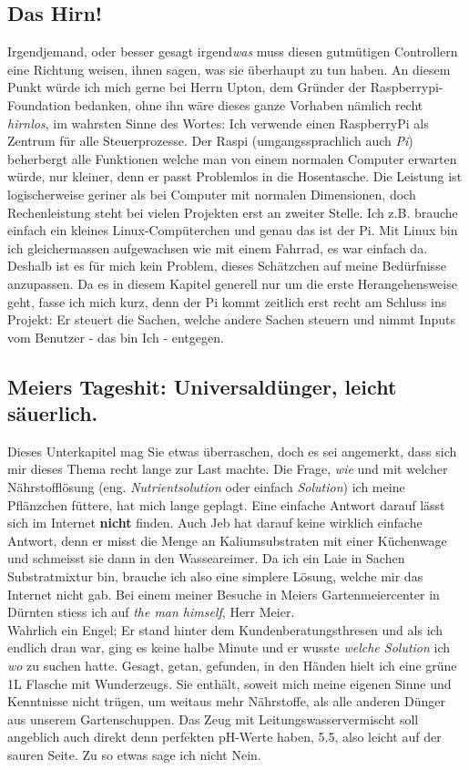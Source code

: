 \documentclass[12pt,titlepage,a4paper]{article}
\begin{document}
\subsection{Das Hirn!}
Irgendjemand, oder besser gesagt irgend\textit{was} muss diesen gutmütigen Controllern eine Richtung weisen, ihnen sagen, was sie überhaupt zu tun haben. An diesem Punkt würde ich mich gerne bei Herrn Upton, dem Gründer der Raspberrypi-Foundation bedanken, ohne ihn wäre dieses ganze Vorhaben nämlich recht \textit{hirnlos}, im wahrsten Sinne des Wortes: Ich verwende einen RaspberryPi als Zentrum für alle Steuerprozesse. Der Raspi (umgangssprachlich auch \textit{Pi}) beherbergt alle Funktionen welche man von einem normalen Computer erwarten würde, nur kleiner, denn er passt Problemlos in die Hosentasche. Die Leistung ist logischerweise geriner als bei Computer mit normalen Dimensionen, doch Rechenleistung steht bei vielen Projekten erst an zweiter Stelle. Ich z.B. brauche einfach ein kleines Linux-Compüterchen und genau das ist der Pi. Mit Linux bin ich gleichermassen aufgewachsen wie mit einem Fahrrad, es war einfach da. Deshalb ist es für mich kein Problem, dieses Schätzchen auf meine Bedürfnisse anzupassen. Da es in diesem Kapitel generell nur um die erste Herangehensweise geht, fasse ich mich kurz, denn der Pi kommt zeitlich erst recht am Schluss ins Projekt: Er steuert die Sachen, welche andere Sachen steuern und nimmt Inputs vom Benutzer - das bin Ich - entgegen.


\subsection{Meiers Tageshit: Universaldünger, leicht säuerlich.}
Dieses Unterkapitel mag Sie etwas überraschen, doch es sei angemerkt, dass sich mir dieses Thema recht lange zur Last machte. Die Frage, \textit{wie} und mit welcher Nährstofflösung (eng. \textit{Nutrientsolution} oder einfach \textit{Solution}) ich meine Pflänzchen füttere, hat mich lange geplagt. Eine einfache Antwort darauf lässt sich im Internet \textbf{nicht} finden. Auch Jeb hat darauf keine wirklich einfache Antwort, denn er misst die Menge an Kaliumsubstraten mit einer Küchenwage und schmeisst sie dann in den Wasseareimer. Da ich ein Laie in Sachen Substratmixtur bin, brauche ich also eine simplere Lösung, welche mir das Internet nicht gab. Bei einem meiner Besuche in Meiers Gartenmeiercenter in Dürnten stiess ich auf \textit{the man himself}, Herr Meier. \\ Wahrlich ein Engel; Er stand hinter dem Kundenberatungsthresen und als ich endlich dran war, ging es keine halbe Minute und er wusste \textit{welche Solution} ich \textit{wo} zu suchen hatte. Gesagt, getan, gefunden, in den Händen hielt ich eine grüne 1L Flasche mit Wunderzeugs. Sie enthält, soweit mich meine eigenen Sinne und Kenntnisse nicht trügen, um weitaus mehr Nährstoffe, als alle anderen Dünger aus unserem Gartenschuppen. Das Zeug mit Leitungswasservermischt soll angeblich auch direkt denn perfekten pH-Werte haben, 5.5, also leicht auf der sauren Seite. Zu so etwas sage ich nicht Nein. 
\end{document}
